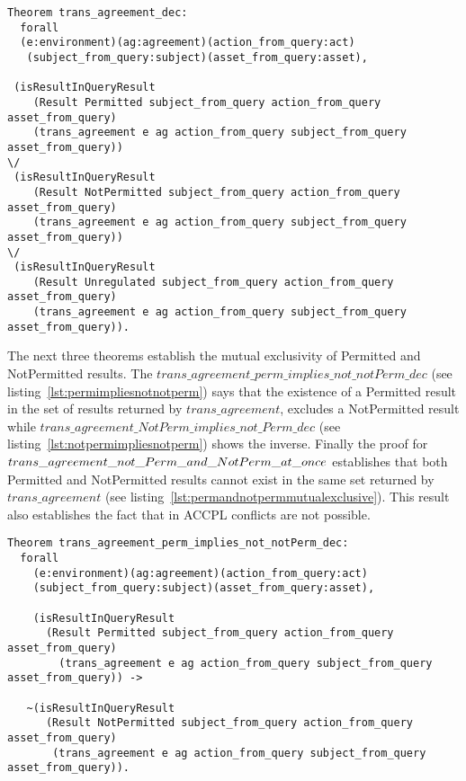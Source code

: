 \begin{lstlisting}
Theorem trans_agreement_dec:
  forall
  (e:environment)(ag:agreement)(action_from_query:act)
   (subject_from_query:subject)(asset_from_query:asset),

 (isResultInQueryResult 
    (Result Permitted subject_from_query action_from_query asset_from_query)
    (trans_agreement e ag action_from_query subject_from_query asset_from_query)) 
\/
 (isResultInQueryResult 
    (Result NotPermitted subject_from_query action_from_query asset_from_query)
    (trans_agreement e ag action_from_query subject_from_query asset_from_query))
\/
 (isResultInQueryResult 
    (Result Unregulated subject_from_query action_from_query asset_from_query)
    (trans_agreement e ag action_from_query subject_from_query asset_from_query)).
\end{lstlisting}


The next three theorems establish the mutual exclusivity of Permitted and NotPermitted results. The $trans\_agreement\_perm\_implies\_not\_notPerm\_dec$ (see listing~\ref{lst:permimpliesnotnotperm}) says that the existence of a Permitted result in the set of results returned by $trans\_agreement$, excludes a NotPermitted result while  $trans\_agreement\_NotPerm\_implies\_not\_Perm\_dec$ (see listing~\ref{lst:notpermimpliesnotperm}) shows the inverse. Finally the proof for $trans\_agreement\_not\_Perm\_and\_ \newline NotPerm\_at\_once$ establishes that both Permitted and NotPermitted results cannot exist in the same set returned by $trans\_agreement$ (see listing~\ref{lst:permandnotpermmutualexclusive}). This result also establishes the fact that in \ac{ACCPL} conflicts are not possible.


\begin{lstlisting}
Theorem trans_agreement_perm_implies_not_notPerm_dec:
  forall
    (e:environment)(ag:agreement)(action_from_query:act)
    (subject_from_query:subject)(asset_from_query:asset),

    (isResultInQueryResult 
      (Result Permitted subject_from_query action_from_query asset_from_query)
        (trans_agreement e ag action_from_query subject_from_query asset_from_query)) ->

   ~(isResultInQueryResult 
      (Result NotPermitted subject_from_query action_from_query asset_from_query)
       (trans_agreement e ag action_from_query subject_from_query asset_from_query)).
\end{lstlisting}


